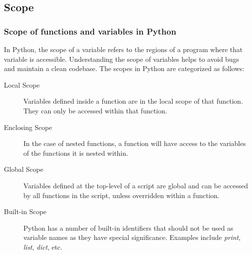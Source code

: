 \subsection{Scope}
\begin{frame}[fragile]
  \frametitle{Scope of functions and variables in Python}

  In Python, the scope of a variable refers to the regions of a program where that variable is accessible. Understanding the scope of variables helps to avoid bugs and maintain a clean codebase. The scopes in Python are categorized as follows:

  \begin{description}
    \item[Local Scope] Variables defined inside a function are in the local scope of that function. They can only be accessed within that function.
    \item[Enclosing Scope] In the case of nested functions, a function will have access to the variables of the functions it is nested within.
    \item[Global Scope] Variables defined at the top-level of a script are global and can be accessed by all functions in the script, unless overridden within a function.
    \item[Built-in Scope] Python has a number of built-in identifiers that should not be used as variable names as they have special significance. Examples include \textit{print}, \textit{list}, \textit{dict}, etc.
  \end{description}

\end{frame}

